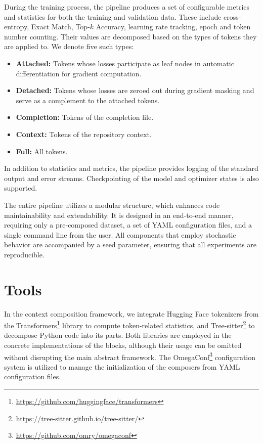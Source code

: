During the training process, the pipeline produces a set of configurable metrics and statistics for both the training and validation data. These include cross-entropy, Exact Match, Top-\(k\) Accuracy, learning rate tracking, epoch and token number counting. Their values are decomposed based on the types of tokens they are applied to. We denote five such types:
\begin{itemize}
    \item \textbf{Attached:} Tokens whose losses participate as leaf nodes in automatic differentiation for gradient computation.
    \item \textbf{Detached:} Tokens whose losses are zeroed out during gradient masking and serve as a complement to the attached tokens.
    \item \textbf{Completion:} Tokens of the completion file.
    \item \textbf{Context:} Tokens of the repository context.
    \item \textbf{Full:} All tokens.
\end{itemize}

In addition to statistics and metrics, the pipeline provides logging of the standard output and error streams. Checkpointing of the model and optimizer states is also supported.

The entire pipeline utilizes a modular structure, which enhances code maintainability and extendability. It is designed in an end-to-end manner, requiring only a pre-composed dataset, a set of YAML configuration files, and a single command line from the user. All components that employ stochastic behavior are accompanied by a seed parameter, ensuring that all experiments are reproducible.

\section{Tools}

In the context composition framework, we integrate Hugging Face tokenizers from the Transformers\footnote{\url{https://github.com/huggingface/transformers}} library to compute token-related statistics, and Tree-sitter\footnote{\url{https://tree-sitter.github.io/tree-sitter/}} to decompose Python code into its parts. Both libraries are employed in the concrete implementations of the blocks, although their usage can be omitted without disrupting the main abstract framework. The OmegaConf\footnote{\url{https://github.com/omry/omegaconf}} configuration system is utilized to manage the initialization of the composers from YAML configuration files.

